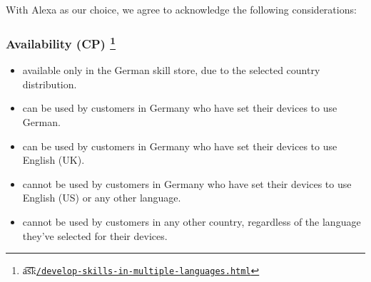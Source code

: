 









With Alexa as our choice, we agree to acknowledge the following considerations:




\subsubsection*{Availability (CP) \footnote{\t{a\t{sk}}\href{https://developer.amazon.com/docs/custom-skills/develop-skills-in-multiple-languages.html}{\lstinline|/develop-skills-in-multiple-languages.html|}}}


\begin{itemize}
	
	\item available only in the German skill store, due to the selected country distribution.
	\item can be used by customers in Germany who have set their devices to use German.
	\item can be used by customers in Germany who have set their devices to use English (UK).
	\item cannot be used by customers in Germany who have set their devices to use English (US) or any other language.
	\item cannot be used by customers in any other country, regardless of the language they've selected for their devices.
	
\end{itemize}


